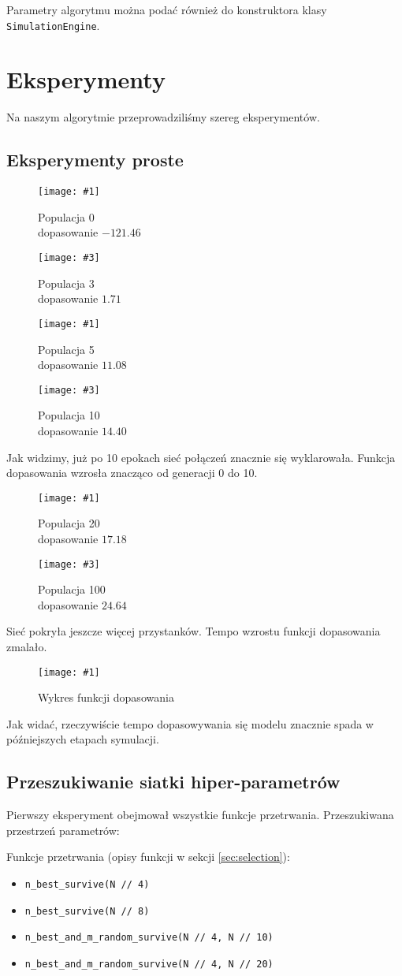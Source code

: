 \documentclass[12pt,a4paper]{article}
\newcommand{\imgcustomsize}[3]{
	\begin{figure}[H]
		\centering
		\texttt{[image: \#1]}
		\caption{#2}
	\end{figure}
}
\newcommand{\imgsidebyside}[4]{
	\begin{figure}[H]
		\centering
		\begin{minipage}{.45\textwidth}
			\centering
			\texttt{[image: \#1]}
			\caption{#2}
		\end{minipage}%
		\hfill
		\begin{minipage}{.45\textwidth}
			\centering
			\texttt{[image: \#3]}
			\caption{#4}
		\end{minipage}
	\end{figure}
}
\begin{document}
Parametry algorytmu można podać również do konstruktora klasy \lstinline|SimulationEngine|.


\section{Eksperymenty}
Na naszym algorytmie przeprowadziliśmy szereg eksperymentów.

\subsection{Eksperymenty proste}
\imgsidebyside{test1/0}{Populacja 0\\ dopasowanie $-121.46$}{test1/3}{Populacja 3\\ dopasowanie $1.71$}
\imgsidebyside{test1/5}{Populacja 5\\ dopasowanie $11.08$}{test1/10}{Populacja 10\\ dopasowanie $14.40$}
Jak widzimy, już po 10 epokach sieć połączeń znacznie się wyklarowała. Funkcja dopasowania wzrosła znacząco od generacji 0 do 10.

\imgsidebyside{test1/20}{Populacja 20\\ dopasowanie $17.18$}{test1/100}{Populacja 100\\ dopasowanie $24.64$}
Sieć pokryła jeszcze więcej przystanków. Tempo wzrostu funkcji dopasowania zmalało.

\imgcustomsize{test1/plot}{Wykres funkcji dopasowania}{0.6}
Jak widać, rzeczywiście tempo dopasowywania się modelu znacznie spada w późniejszych etapach symulacji.

\subsection{Przeszukiwanie siatki hiper-parametrów}

Pierwszy eksperyment obejmował wszystkie funkcje przetrwania. Przeszukiwana przestrzeń parametrów:


Funkcje przetrwania (opisy funkcji w sekcji \ref{sec:selection}):
\begin{itemize}
	\item [0] \lstinline|n_best_survive(N // 4)|
	\item [1] \lstinline|n_best_survive(N // 8)|
	\item [2] \lstinline|n_best_and_m_random_survive(N // 4, N // 10)|
	\item [3] \lstinline|n_best_and_m_random_survive(N // 4, N // 20)|
\end{itemize}
\end{document}
